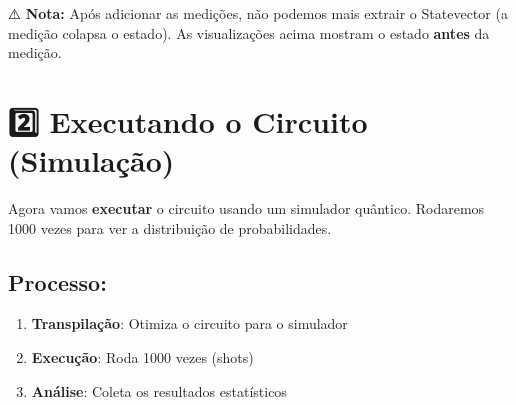 \documentclass[
  brazilian,
]{report}
\providecommand{\tightlist}{%
  \setlength{\itemsep}{0pt}\setlength{\parskip}{0pt}}
\begin{document}
⚠️ \textbf{Nota:} Após adicionar as medições, não podemos mais extrair o
Statevector (a medição colapsa o estado). As visualizações acima mostram
o estado \textbf{antes} da medição.

\section{2️⃣ Executando o Circuito
(Simulação)}\label{executando-o-circuito-simulauxe7uxe3o}

Agora vamos \textbf{executar} o circuito usando um simulador quântico.
Rodaremos 1000 vezes para ver a distribuição de probabilidades.

\subsection{Processo:}\label{processo}

\begin{enumerate}
\def\labelenumi{\arabic{enumi}.}
\tightlist
\item
  \textbf{Transpilação}: Otimiza o circuito para o simulador
\item
  \textbf{Execução}: Roda 1000 vezes (shots)
\item
  \textbf{Análise}: Coleta os resultados estatísticos
\end{enumerate}
\end{document}
